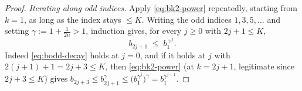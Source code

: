 \begin{proof}
\emph{Iterating along odd indices.} Apply \eqref{eq:bk2-power} repeatedly,
starting from $k=1$, as long as the index stays $\le K$. Writing the odd
indices $1,3,5,\dots$ and setting $\gamma:=1+\tfrac1{2n}>1$, induction
gives, for every $j\ge0$ with $2j+1\le K$,
\begin{equation}\label{eq:bodd-decay}
   b_{2j+1}\;\le\;b_1^{\,\gamma^{\,j}} .
\end{equation}
Indeed \eqref{eq:bodd-decay} holds at $j=0$, and if it holds at $j$ with
$2(j+1)+1=2j+3\le K$, then \eqref{eq:bk2-power} (at $k=2j+1$, legitimate
since $2j+3\le K$) gives
$b_{2j+3}\le b_{2j+1}^{\gamma}\le\bigl(b_1^{\gamma^{j}}\bigr)^{\gamma}
=b_1^{\gamma^{j+1}}$.


\end{proof}
